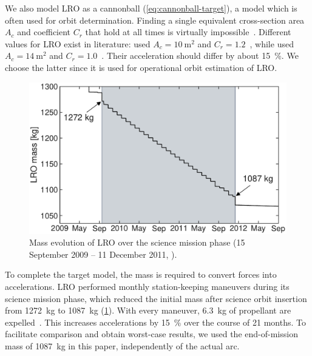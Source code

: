 We also model \gls{LRO} as a cannonball (\cref{eq:cannonball-target}), a model which is often used for orbit determination. Finding a single equivalent cross-section area $A_c$ and coefficient $C_r$ that hold at all times is virtually impossible~\cite{Vallado2013}. Different values for \gls{LRO} exist in literature: \citeauthor{Bauer2016} used $A_c = \qty{10}{\m\squared}$ and $C_r = 1.2$~\cite{Bauer2016}, while \citeauthor{Nicholson2010} used $A_c=\qty{14}{\m\squared}$ and $C_r = 1.0$~\cite{Nicholson2010}. Their acceleration should differ by about \qty{15}{\percent}. We choose the latter since it is used for operational orbit estimation of \gls{LRO}.

\begin{figure}[t]
    \centering
    \includegraphics[width=\linewidth]{figures/plots/mass_history.pdf}
    \caption{Mass evolution of \gls{LRO} over the science mission phase (15 September 2009 -- 11 December 2011, \textcolor[RGB]{206, 211, 217}{}). }
    \label{fig:mass-history}
\end{figure}

To complete the target model, the mass is required to convert forces into accelerations. \gls{LRO} performed monthly station-keeping maneuvers during its science mission phase, which reduced the initial mass after science orbit insertion from \qty{1272}{kg} to \qty{1087}{kg} (\cref{fig:mass-history}). With every maneuver, \qty{6.3}{kg} of propellant are expelled~\cite{Mesarch2010}. This increases accelerations by \qty{15}{\percent} over the course of 21 months. To facilitate comparison and obtain worst-case results, we used the end-of-mission mass of \qty{1087}{kg} in this paper, independently of the actual arc.





